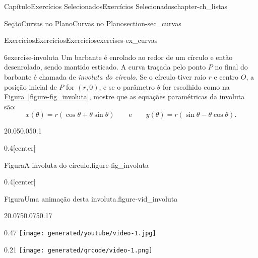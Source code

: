 \documentclass[oneside,10pt,]{book}
\newcommand{\xreffont}{\relax}
\numberwithin{equation}{section}
\begin{document}
\begin{chapterptx}{Capítulo}{Exercícios Selecionados}{}{Exercícios Selecionados}{}{}{chapter-ch_listas}
\begin{sectionptx}{Seção}{Curvas no Plano}{}{Curvas no Plano}{}{}{section-sec_curvas}
\begin{exercises-subsection-numberless}{Exercícios}{Exercícios}{}{Exercícios}{}{}{exercises-ex_curvas}
\begin{divisionexercise}{6}{}{}{exercise-involuta}%
Um barbante é enrolado ao redor de um círculo e então desenrolado, sendo mantido esticado. A curva traçada pelo ponto \(P\) no final do barbante é chamada de \emph{involuta do círculo}. Se o círculo tiver raio \(r\) e centro \(O\), a posição inicial de \(P\) for \((r, 0)\), e se o parâmetro \(\theta\) for escolhido como na \hyperref[figure-fig_involuta]{Figura~{\xreffont\ref{figure-fig_involuta}}}, mostre que as equações paramétricas da involuta são:%
\begin{equation*}
x(\theta) = r
(\cos\theta+\theta\sin\theta)\qquad\text{e} \qquad y(\theta) =
r (\sin\theta-\theta\cos\theta).
\end{equation*}
%
\begin{sidebyside}{2}{0.05}{0.05}{0.1}%
\begin{sbspanel}{0.4}[center]%
\begin{panelfigureptx}{Figura}{A involuta do círculo.}{figure-fig_involuta}{}%
%
\tcblower
\end{panelfigureptx}%
\end{sbspanel}%
\begin{sbspanel}{0.4}[center]%
\begin{panelfigureptx}{Figura}{Uma animação desta involuta.}{figure-vid_involuta}{}%
\begin{sidebyside}{2}{0.075}{0.075}{0.17}%
\begin{sbspanel}{0.47}%
\texttt{[image: generated/youtube/video-1.jpg]}
\end{sbspanel}%
\begin{sbspanel}{0.21}%
\texttt{[image: generated/qrcode/video-1.png]}
\end{sbspanel}%
\end{sidebyside}%

\end{panelfigureptx}
\end{sbspanel}
\end{sidebyside}
\end{divisionexercise}
\end{exercises-subsection-numberless}
\end{sectionptx}
\end{chapterptx}
\end{document}
